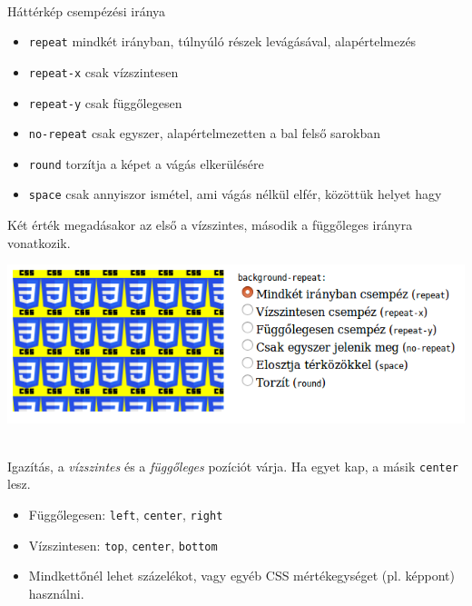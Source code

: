 \begin{frame}
  \begin{description}[m]
    \item[\texttt{background-repeat}] \hfill \\ Háttérkép 
    csempézési iránya
    \begin{itemize}
      \item \texttt{repeat} mindkét irányban, túlnyúló részek 
      levágásával, alapértelmezés
      \item \texttt{repeat-x} csak vízszintesen
      \item \texttt{repeat-y} csak függőlegesen
      \item \texttt{no-repeat} csak egyszer, alapértelmezetten a bal 
      felső sarokban
      \item \texttt{round} torzítja a képet a vágás elkerülésére
      \item \texttt{space} csak annyiszor ismétel, ami vágás 
      nélkül elfér, közöttük helyet hagy
    \end{itemize}
    Két érték megadásakor az első a vízszintes, második a 
    függőleges irányra vonatkozik.
  \end{description}
\end{frame}

\begin{frame}
  \begin{center}
    \includegraphics[width=.75\textwidth]{hatter.png}\\
  \end{center}
\end{frame}

\begin{frame}
  \begin{description}[m]
    \item[\texttt{background-position}] \hfill \\ Igazítás, a 
      \emph{vízszintes} és a \emph{függőleges} pozíciót várja. Ha egyet 
      kap, a másik \texttt{center} lesz.
      \begin{itemize}
        \item Függőlegesen: \texttt{left}, \texttt{center}, 
        \texttt{right}
        \item Vízszintesen: \texttt{top}, \texttt{center}, 
        \texttt{bottom}
        \item Mindkettőnél lehet százelékot, vagy egyéb CSS 
        mértékegységet (pl. képpont) használni. 
      \end{itemize}
  \end{description}
\end{frame}

